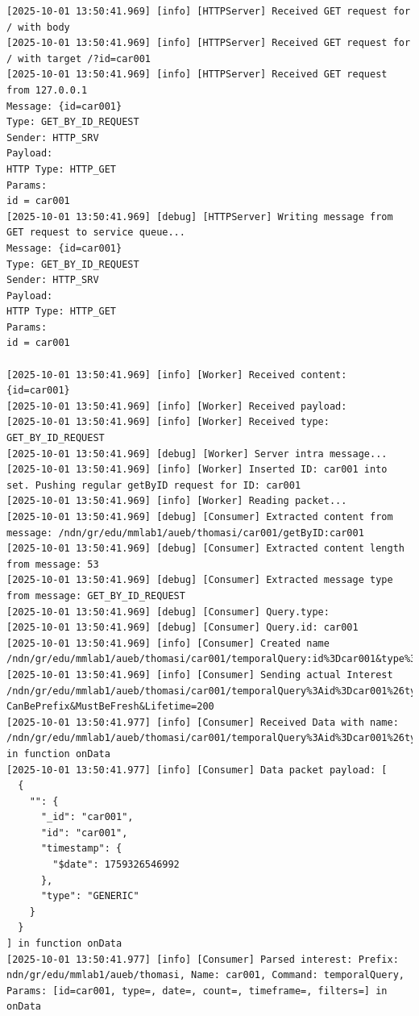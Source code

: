 \documentclass{article}
\begin{document}
\begin{lstlisting}[language=log, caption={After GET by ID of \textit{@id=car001} and response from \emph{MMLab1}-Producer}, label={lst:consumer-logs-get-by-id-car001}]
[2025-10-01 13:50:41.969] [info] [HTTPServer] Received GET request for / with body 
[2025-10-01 13:50:41.969] [info] [HTTPServer] Received GET request for / with target /?id=car001
[2025-10-01 13:50:41.969] [info] [HTTPServer] Received GET request from 127.0.0.1
Message: {id=car001}
Type: GET_BY_ID_REQUEST
Sender: HTTP_SRV
Payload: 
HTTP Type: HTTP_GET
Params:
id = car001
[2025-10-01 13:50:41.969] [debug] [HTTPServer] Writing message from GET request to service queue...
Message: {id=car001}
Type: GET_BY_ID_REQUEST
Sender: HTTP_SRV
Payload: 
HTTP Type: HTTP_GET
Params:
id = car001

[2025-10-01 13:50:41.969] [info] [Worker] Received content: {id=car001}
[2025-10-01 13:50:41.969] [info] [Worker] Received payload: 
[2025-10-01 13:50:41.969] [info] [Worker] Received type: GET_BY_ID_REQUEST
[2025-10-01 13:50:41.969] [debug] [Worker] Server intra message...
[2025-10-01 13:50:41.969] [info] [Worker] Inserted ID: car001 into set. Pushing regular getByID request for ID: car001
[2025-10-01 13:50:41.969] [info] [Worker] Reading packet...
[2025-10-01 13:50:41.969] [debug] [Consumer] Extracted content from message: /ndn/gr/edu/mmlab1/aueb/thomasi/car001/getByID:car001
[2025-10-01 13:50:41.969] [debug] [Consumer] Extracted content length from message: 53
[2025-10-01 13:50:41.969] [debug] [Consumer] Extracted message type from message: GET_BY_ID_REQUEST
[2025-10-01 13:50:41.969] [debug] [Consumer] Query.type: 
[2025-10-01 13:50:41.969] [debug] [Consumer] Query.id: car001
[2025-10-01 13:50:41.969] [info] [Consumer] Created name /ndn/gr/edu/mmlab1/aueb/thomasi/car001/temporalQuery:id%3Dcar001&type%3D&date%3D&count%3D&timeframe%3D&filters%3D
[2025-10-01 13:50:41.969] [info] [Consumer] Sending actual Interest /ndn/gr/edu/mmlab1/aueb/thomasi/car001/temporalQuery%3Aid%3Dcar001%26type%3D%26date%3D%26count%3D%26timeframe%3D%26filters%3D?CanBePrefix&MustBeFresh&Lifetime=200
[2025-10-01 13:50:41.977] [info] [Consumer] Received Data with name: /ndn/gr/edu/mmlab1/aueb/thomasi/car001/temporalQuery%3Aid%3Dcar001%26type%3D%26date%3D%26count%3D%26timeframe%3D%26filters%3D in function onData
[2025-10-01 13:50:41.977] [info] [Consumer] Data packet payload: [
  {
    "": {
      "_id": "car001",
      "id": "car001",
      "timestamp": {
        "$date": 1759326546992
      },
      "type": "GENERIC"
    }
  }
] in function onData
[2025-10-01 13:50:41.977] [info] [Consumer] Parsed interest: Prefix: ndn/gr/edu/mmlab1/aueb/thomasi, Name: car001, Command: temporalQuery, Params: [id=car001, type=, date=, count=, timeframe=, filters=] in onData

\end{lstlisting}
\end{document}
